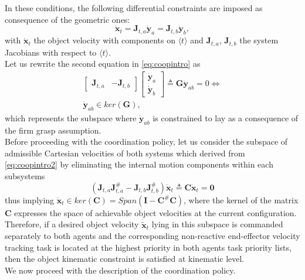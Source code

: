 \documentclass[a4paper, 12pt, notitlepage]{article}
\begin{document}
\begin{multicols}{2}
		In these conditions, the following differential constraints are imposed as consequence of the geometric ones:
		\begin{equation}\label{eq:coopintro}
		\dot{\boldsymbol{x}}_t = \boldsymbol{J}_{t,a} \dot{\boldsymbol{y}}_a = \boldsymbol{J}_{t,b} \dot{\boldsymbol{y}}_b,
		\end{equation}
		with $\dot{\boldsymbol{x}}_t$ the object velocity with components on $\langle t \rangle$ and $\boldsymbol{J}_{t,a}$, $\boldsymbol{J}_{t,b}$ the system Jacobians with respect to $\langle t \rangle$.\\Let us rewrite the second equation in \eqref{eq:coopintro} as
		\begin{equation}\label{eq:coopintro2}
		\begin{gathered}
		\begin{bmatrix}
		\boldsymbol{J}_{t,a} & -\boldsymbol{J}_{t,b}
		\end{bmatrix}
		\begin{bmatrix}
		\dot{\boldsymbol{y}}_a \\ \dot{\boldsymbol{y}}_b
		\end{bmatrix}
		\triangleq \boldsymbol{G}\dot{\boldsymbol{y}}_{ab}=0 \Longleftrightarrow \\ \dot{\boldsymbol{y}}_{ab} \in ker(\boldsymbol{G}),
		\end{gathered}
		\end{equation}
		which represents the subspace where $\boldsymbol{\dot{y}}_{ab}$ is constrained to lay as a consequence of the firm grasp assumption. \\
		Before proceeding with the coordination policy, let us consider the subspace of admissible Cartesian velocities of both systems which derived from \eqref{eq:coopintro2} by eliminating the internal motion components within each subsystems
		\begin{equation}
		(\boldsymbol{J}_{t,a} \boldsymbol{J}^\#_{t,a} - \boldsymbol{J}_{t,b} \boldsymbol{J}^\#_{t,b}) 
		\dot{\boldsymbol{x}}_t \triangleq \boldsymbol{C} \dot{\boldsymbol{x}}_t = \boldsymbol{0}
		\end{equation}
		thus implying $\dot{\boldsymbol{x}}_t \in ker(\boldsymbol{C}) = Span(\boldsymbol{I} - \boldsymbol{C}^\#\boldsymbol{C})$, where the kernel of the matrix $\boldsymbol{C}$ expresses the space of achievable object velocities at the current configuration. Therefore, if a desired object velocity $\dot{\tilde{\boldsymbol{x}}}_t$ lying in this subspace is commanded separately to both agents and the corresponding non-reactive end-effector velocity tracking task is located at the highest priority in both agents task priority lists, then the object kinematic constraint is satisfied at kinematic level.\\
		We now proceed with the description of the coordination policy.	
		

\end{multicols}
\end{document}
